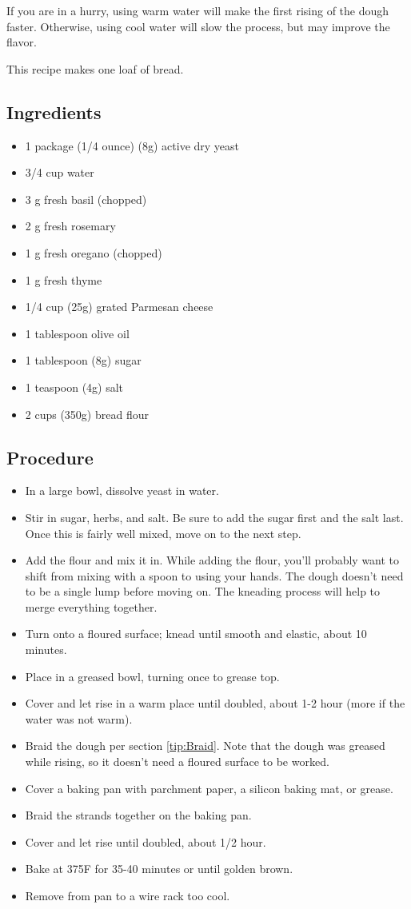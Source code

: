 \documentclass[10pt, openany]{book}
\begin{document}
If you are in a hurry, using warm water will make the first rising of the dough faster.  Otherwise, using cool water will slow the process, but may improve the flavor.

This recipe makes one loaf of bread.

\subsection{Ingredients}
\begin{itemize}
  \item 1 package (1/4 ounce) (8g) active dry yeast
  \item 3/4 cup water
  \item 3 g fresh basil (chopped)
  \item 2 g fresh rosemary
  \item 1 g fresh oregano (chopped)
  \item 1 g fresh thyme
  \item 1/4 cup (25g) grated Parmesan cheese
  \item 1 tablespoon olive oil
  \item 1 tablespoon (8g) sugar
  \item 1 teaspoon (4g) salt
  \item 2 cups (350g) bread flour
\end{itemize}
\subsection{Procedure}
\begin{itemize}
  \item In a large bowl, dissolve yeast in water.
  \item Stir in sugar, herbs, and salt.  Be sure to add the sugar first and the salt last.  Once this is fairly well mixed, move on to the next step.
  \item Add the flour and mix it in.  While adding the flour, you'll probably want to shift from mixing with a spoon to using your hands.  The dough doesn't need to be a single lump before moving on.  The kneading process will help to merge everything together.
  \item Turn onto a floured surface; knead until smooth and elastic, about 10 minutes.
  \item Place in a greased bowl, turning once to grease top.
  \item Cover and let rise in a warm place until doubled, about 1-2 hour (more if the water was not warm).
  \item Braid the dough per section \ref{tip:Braid}.  Note that the dough was greased while rising, so it doesn't need a floured surface to be worked.
  \item Cover a baking pan with parchment paper, a silicon baking mat, or grease.
  \item Braid the strands together on the baking pan.
  \item Cover and let rise until doubled, about 1/2 hour.
  \item Bake at 375\degree{}F for 35-40 minutes or until golden brown.
  \item Remove from pan to a wire rack too cool.
\end{itemize}
\end{document}
